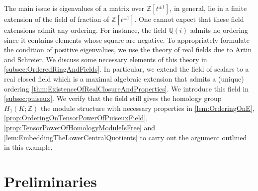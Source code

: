 \documentclass{amsart}
\begin{document}
The main issue is eigenvalues of a matrix over $\mathbb{Z}[t^{\pm 1}]$, in general, lie in a finite extension of the field of fraction of $\mathbb{Z}[t^{\pm 1}]$. One cannot expect that these field extensions admit any ordering. For instance, the field $\mathbb{Q}(i)$ admits no ordering since it contains elements whose square are negative. To appropriately formulate the condition of positive eigenvalues, we use the theory of real fields due to Artin and Schreier. We discuss some necessary elements of this theory in \cref{subsec:OrderedRingAndFields}. In particular, we extend the field of scalars to a real closed field which is a maximal algebraic extension that admits a (unique) ordering \cref{thm:ExistenceOfRealClosureAndProperties}. We introduce this field in \cref{subsec:puiseux}. We verify that the field still gives the homology group $H_1(K;\mathbb{Z})$ the module structure with necessary properties in \cref{lem:OrderingOnE}, \cref{prop:OrderingOnTensorPowerOfPuiseuxField}, \cref{prop:TensorPowerOfHomologyModuleIsFree} and \cref{lem:EmbeddingTheLowerCentralQuotients} to carry out the argument outlined in this example. 


\section{Preliminaries}


\end{document}
